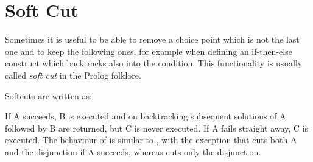 \section{Soft Cut}
Sometimes it is useful to be able to remove a choice point which is
not the last one and to keep the following ones, for example
when defining an if-then-else construct which backtracks also
into the condition.
This functionality is usually called {\it soft cut} in the Prolog
folklore.

Softcuts are written as:
\begin{quote}
%
\end{quote}
If A succeeds, B is executed and on backtracking subsequent
solutions of A followed by B are returned, but C is never executed.
If A fails straight away, C is executed.
The behaviour of
is similar to
,
with the exception that 
cuts both A and the disjunction if A succeeds, whereas
cuts only the disjunction.

